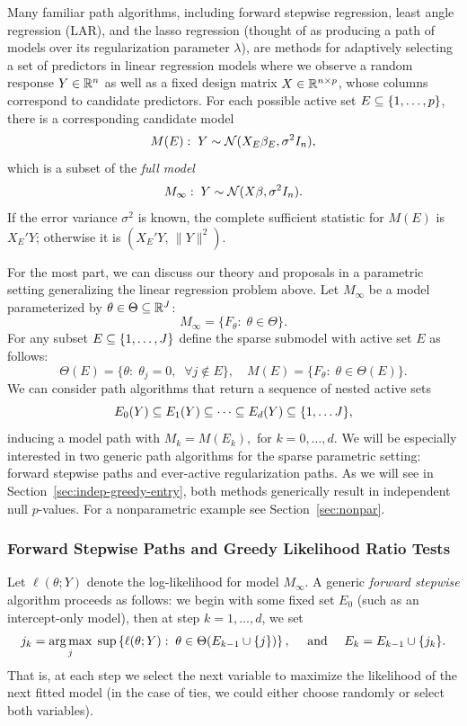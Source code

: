 \documentclass{article}
\begin{document}
Many familiar path algorithms, including forward stepwise regression, least angle regression (LAR), and the lasso regression (thought of as producing a path of models over its regularization parameter $\lambda$), are methods for adaptively selecting a set of predictors in linear regression models where we observe a random response $Y\in \mathbb{R}^n$ as well as a fixed design matrix $X\in \mathbb{R}^{n \times p}$, whose columns correspond to candidate predictors. For each possible active set $E \subseteq \{1,\ldots,p\}$, there is a corresponding candidate model
\[
M(E):\; Y \sim \mathcal{N}( X_E\beta_E, \sigma^2 I_n),
\]
which is a subset of the {\em full model}
\[
M_\infty:\; Y \sim \mathcal{N}(X\beta, \sigma^2I_n).
\]
If the error variance $\sigma^2$ is known, the complete sufficient statistic for $M(E)$ is $X_E'Y$; otherwise it is $\left(X_E'Y,\, \|Y\|^2\right)$.

For the most part, we can discuss our theory and proposals in a parametric setting generalizing the linear regression problem above. Let $M_\infty$ be a model parameterized by $\theta\in \Theta \subseteq \mathbb{R}^J$:
\[
M_\infty = \{F_\theta:\; \theta \in \Theta\}.
\]
For any subset $E\subseteq \{1,\ldots, J\}$ define the sparse submodel with active set $E$ as follows:
\[
\Theta(E) = \{\theta:\; \theta_j = 0, \;\;\forall j \notin E\}, 
\quad M(E) = \{F_\theta:\; \theta\in \Theta(E)\}.
\]
We can consider path algorithms that return a sequence of nested active sets
\[
E_0(Y) \subseteq E_1(Y) \subseteq \cdots \subseteq E_d(Y) \subseteq \{1,\ldots J\},
\]
inducing a model path with $M_k = M(E_k),$ for $k=0,\ldots,d$. We will be especially interested in two generic path algorithms for the sparse parametric setting: forward stepwise paths and ever-active regularization paths. As we will see in Section~\ref{sec:indep-greedy-entry}, both methods generically result in independent null $p$-values. For a nonparametric example see Section~\ref{sec:nonpar}.

\subsubsection{Forward Stepwise Paths and Greedy Likelihood Ratio Tests}
Let $\ell(\theta; Y)$ denote the log-likelihood for model
$M_\infty$. A generic {\em forward stepwise} algorithm proceeds as follows: we begin with some fixed set $E_0$ (such as an intercept-only model), then at step $k=1,\ldots,d$, we set
\begin{equation}
j_k = \operatorname*{arg\,max}_j \; \sup \left\{\ell(\theta; Y):\; \theta\in\Theta(E_{k-1} \cup \{j\})\right\}, \quad \text{ and } \quad
E_k = E_{k-1} \cup \{j_k\}.
\end{equation}
That is, at each step we select the next variable to maximize the likelihood of the next fitted model (in the case of ties, we could either choose randomly or select both variables).
\end{document}
